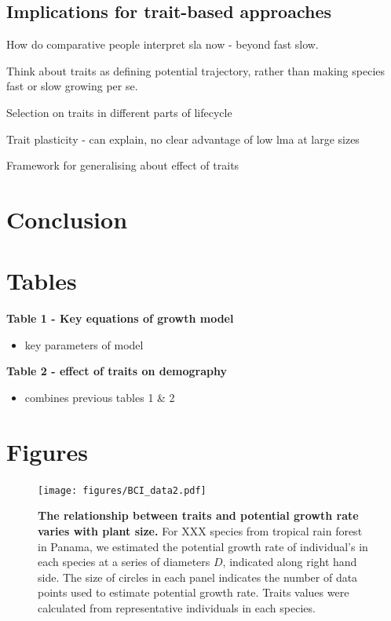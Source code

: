 \documentclass[12pt, a4paper]{article}
\begin{document}
\subsection*{Implications for trait-based
approaches}\label{implications-for-trait-based-approaches}

How do comparative people interpret sla now - beyond fast slow.

Think about traits as defining potential trajectory, rather than making
species fast or slow growing per se.

Selection on traits in different parts of lifecycle

Trait plasticity - can explain, no clear advantage of low lma at large
sizes

Framework for generalising about effect of traits

\section*{Conclusion}\label{conclusion}

\newpage

\section*{Tables}\label{tables}

\textbf{Table 1 - Key equations of growth model}

\begin{itemize}
\itemsep1pt\parskip0pt
\item
  key parameters of model
\end{itemize}

\textbf{Table 2 - effect of traits on demography}

\begin{itemize}
\itemsep1pt\parskip0pt
\item
  combines previous tables 1 \& 2
\end{itemize}


\newpage

\section*{Figures}\label{figures}

\begin{figure}[htbp]
\centering
\texttt{[image: figures/BCI\_data2.pdf]}
\caption{\textbf{The relationship between traits and potential growth
rate varies with plant size.} For XXX species from tropical rain forest
in Panama, we estimated the potential growth rate of individual's in
each species at a series of diameters \(D\), indicated along right hand
side. The size of circles in each panel indicates the number of data
points used to estimate potential growth rate. Traits values were
calculated from representative individuals in each species.
\label{f-BCI}}
\end{figure}
\end{document}

